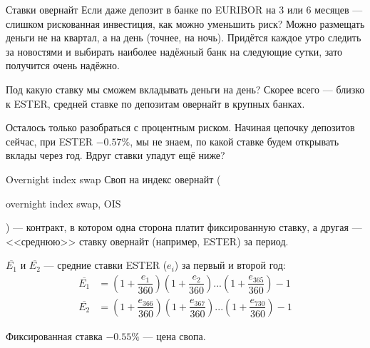 \documentclass{beamer}
\renewcommand{\EUR}[1]{\textup{\euro}#1}
\newcommand{\en}[1]{\begin{otherlanguage}{english}#1\end{otherlanguage}}
\begin{document}
\begin{frame}{Ставки овернайт}
\justify
Если даже депозит в банке по EURIBOR на 3 или 6 месяцев --- слишком рискованная инвестиция, как можно уменьшить риск? Можно размещать деньги не на квартал, а на день (точнее, на ночь). Придётся каждое утро следить за новостями и выбирать наиболее надёжный банк на следующие сутки, зато получится очень надёжно.

\justify
Под какую ставку мы сможем вкладывать деньги на день? Скорее всего --- близко к ESTER, средней ставке по депозитам овернайт в крупных банках.

\justify
Осталось только разобраться с процентным риском. Начиная цепочку депозитов сейчас, при ESTER $-0.57\%$, мы не знаем, по какой ставке будем открывать вклады через год. Вдруг ставки упадут ещё ниже?
\end{frame}



\begin{frame}{Overnight index swap}
\justify
Своп на индекс овернайт (\en{overnight index swap, OIS}) --- контракт, в котором одна сторона платит фиксированную ставку, а другая --- <<среднюю>> ставку овернайт (например, ESTER) за период.

\justify
\centering
{}

\justify
$\overline{E_1}$ и $\overline{E_2}$ --- средние ставки ESTER ($e_i$) за первый и второй год:
\begin{align*}
\overline{E_1} &= \left(1 + \dfrac{e_1}{360}\right)
\left(1 + \dfrac{e_2}{360}\right)
...
\left(1 + \dfrac{e_{365}}{360}\right) - 1 \\
\overline{E_2} &= \left(1 + \dfrac{e_{366}}{360}\right)
\left(1 + \dfrac{e_{367}}{360}\right)...
\left(1 + \dfrac{e_{730}}{360}\right) - 1
\end{align*}

\justify
Фиксированная ставка $-0.55\%$ --- цена свопа.
\end{frame}
\end{document}

